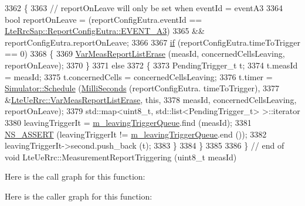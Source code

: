 \begin{DoxyCode}
3362     \{
3363       \textcolor{comment}{// reportOnLeave will only be set when eventId = eventA3}
3364       \textcolor{keywordtype}{bool} reportOnLeave = (reportConfigEutra.eventId == 
      \hyperlink{structns3_1_1LteRrcSap_1_1ReportConfigEutra_ab8152dc095987f60bee2e9115046902fa2899a3564e1c06edb586b1768ccf3acd}{LteRrcSap::ReportConfigEutra::EVENT\_A3})
3365         && reportConfigEutra.reportOnLeave;
3366 
3367       \hyperlink{loss__ITU1238_8m_a419d895abe1313c35fa353c93802647e}{if} (reportConfigEutra.timeToTrigger == 0)
3368         \{
3369           \hyperlink{classns3_1_1LteUeRrc_a3c540caa38f291f381ad1140809c49a0}{VarMeasReportListErase} (measId, concernedCellsLeaving, reportOnLeave);
3370         \}
3371       \textcolor{keywordflow}{else}
3372         \{
3373           PendingTrigger\_t t;
3374           t.measId = measId;
3375           t.concernedCells = concernedCellsLeaving;
3376           t.timer = \hyperlink{classns3_1_1Simulator_a671882c894a08af4a5e91181bf1eec13}{Simulator::Schedule} (\hyperlink{group__timecivil_gaf26127cf4571146b83a92ee18679c7a9}{MilliSeconds} (reportConfigEutra.
      timeToTrigger),
3377                                          &\hyperlink{classns3_1_1LteUeRrc_a3c540caa38f291f381ad1140809c49a0}{LteUeRrc::VarMeasReportListErase},
       \textcolor{keyword}{this},
3378                                          measId, concernedCellsLeaving, reportOnLeave);
3379           std::map<uint8\_t, std::list<PendingTrigger\_t> >::iterator
3380             leavingTriggerIt = \hyperlink{classns3_1_1LteUeRrc_a7984d05cbcc51cd9239a22bd7e400d06}{m\_leavingTriggerQueue}.find (measId);
3381           \hyperlink{assert_8h_a6dccdb0de9b252f60088ce281c49d052}{NS\_ASSERT} (leavingTriggerIt != \hyperlink{classns3_1_1LteUeRrc_a7984d05cbcc51cd9239a22bd7e400d06}{m\_leavingTriggerQueue}.end ());
3382           leavingTriggerIt->second.push\_back (t);
3383         \}
3384     \}
3385 
3386 \} \textcolor{comment}{// end of void LteUeRrc::MeasurementReportTriggering (uint8\_t measId)}
\end{DoxyCode}


Here is the call graph for this function\+:




Here is the caller graph for this function\+:


